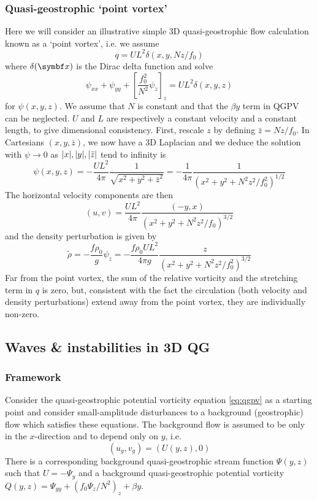 \documentclass{jknotes}
\begin{document}
\subsubsection{Quasi-geostrophic `point vortex'}
Here we will consider an illustrative simple 3D quasi-geostrophic flow
calculation known as a `point vortex', i.e. we assume
\begin{equation}
	q = U L^2 \delta(x,y, Nz/f_0)
\end{equation}
where $\delta(\x)$ is the Dirac delta function and solve
\begin{equation}
	\psi_{xx} + \psi_{yy} + \left[ \frac{f_0^2}{N^2} \psi_z\right]_z = UL^2
	\delta(x,y,z)
\end{equation}
for $\psi(x,y,z)$. We assume that $N$ is constant and that the $\beta y$ term
in QGPV can be neglected. $U$ and $L$ are respectively a constant velocity and
a constant length, to give dimensional consistency. First, rescale $z$ by
defining $\bar{z} = Nz/f_0$. In Cartesians $(x,y,\bar{z})$, we now have a 3D
Laplacian and we deduce the solution with $\psi \to 0$ as $\abs{x}, \abs{y},
\abs{\bar{z}}$ tend to infinity is
\begin{equation}
	\psi(x,y,z) = -\frac{UL^2}{4\pi} \frac{1}{\sqrt{x^2+y^2+\bar{z}^2}} =
	-\frac{1}{4\pi} \frac{1}{(x^2+y^2+N^2z^2/f_0^2)^{1/2}}
\end{equation}
The horizontal velocity components are then
\begin{equation}
	(u,v) = \frac{UL^2}{4\pi} \frac{(-y,x)}{(x^2+y^2+N^2z^2/f_0)^{3/2}}
\end{equation}
and the density perturbation is given by
\begin{equation}
	\tilde{\rho} = -\frac{f \rho_0}{g} \psi_z = -\frac{f \rho_0 U L^2}{4\pi g}
	\frac{z}{(x^2+y^2+N^2z^2/f_0^2)^{3/2}}
\end{equation}
Far from the point vortex, the sum of the relative vorticity and the
stretching term in $q$ is zero, but, consistent with the fact the circulation
(both velocity and density perturbations) extend away from the point vortex,
they are individually non-zero.

\subsection{Waves \& instabilities in 3D QG}
\label{ss:3dqg}
\subsubsection{Framework}
Consider the quasi-geostrophic potential vorticity equation \eqref{eq:qgpv} as
a starting point and consider small-amplitude disturbances to a background
(geostrophic) flow which satisfies these equations. The background flow is
assumed to be only in the $x$-direction and to depend only on $y$, i.e.
\begin{equation}
	(u_g,v_g) = (U(y,z), 0)
\end{equation}
There is a corresponding background quasi-geostrophic stream function
$\Psi(y,z)$ such that $U = -\Psi_y$ and a background quasi-geostrophic
potential vorticity $Q(y,z) = \Psi_{yy} + (f_0\Psi_z/N^2)_z + \beta y$.
\end{document}
